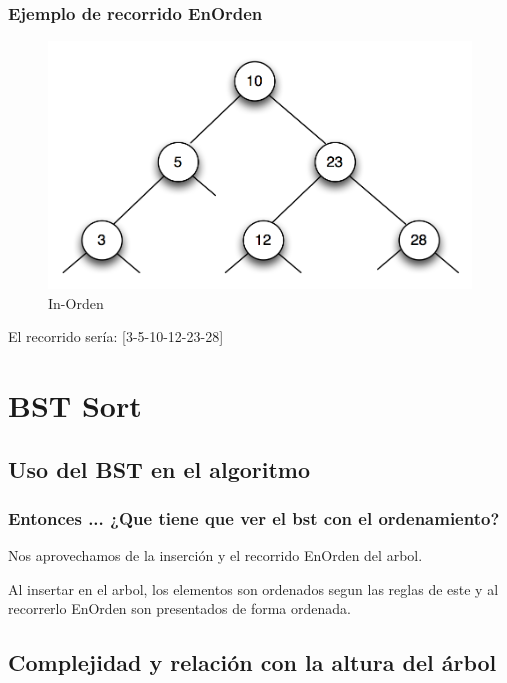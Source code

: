 \documentclass{beamer}
\begin{document}
		\begin{frame}
			\frametitle{Ejemplo de recorrido EnOrden}
			\begin{figure}
  				\centering
    			\includegraphics[scale=0.5]{inorden.png}
  				\caption{In-Orden}
  				\label{fig:inorden}
			\end{figure}
		
			\begin{center}
				El recorrido sería: [3-5-10-12-23-28]
			\end{center}
		\end{frame}
\section{BST Sort}

	\subsection{Uso del BST en el algoritmo}

		\begin{frame}
			\frametitle{Entonces ... ¿Que tiene que ver el bst con el ordenamiento?}
			Nos aprovechamos de la inserción y el recorrido EnOrden del arbol.
			\newline

			Al insertar en el arbol, los elementos son ordenados segun las reglas de este y al recorrerlo EnOrden son presentados de forma ordenada.
		\end{frame}


	\subsection{Complejidad y relación con la altura del árbol}
\end{document}
